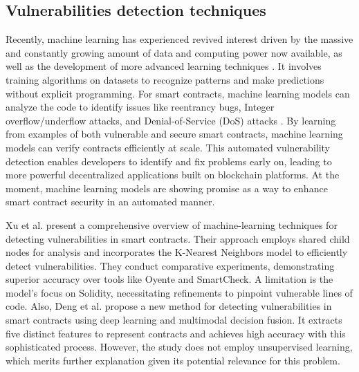 \documentclass[sigconf]{acmart}
\begin{document}
\subsection{Vulnerabilities detection techniques}
Recently, machine learning has experienced revived interest driven by the massive and constantly growing amount of data and computing power now available, as well as the development of more advanced learning techniques \cite{badillo2020introduction}. It involves training algorithms on datasets to recognize patterns and make predictions without explicit programming. For smart contracts, machine learning models can analyze the code to identify issues like reentrancy bugs, Integer overflow/underflow attacks, and Denial-of-Service (DoS) attacks \cite{krichen2023strengthening}. By learning from examples of both vulnerable and secure smart contracts, machine learning models can verify contracts efficiently at scale. This automated vulnerability detection enables developers to identify and fix problems early on, leading to more powerful decentralized applications built on blockchain platforms. At the moment, machine learning models are showing promise as a way to enhance smart contract security in an automated manner.

Xu et al. \cite{xu2021novel} present a comprehensive overview of machine-learning techniques for detecting vulnerabilities in smart contracts. Their approach employs shared child nodes for analysis and incorporates the K-Nearest Neighbors model to efficiently detect vulnerabilities. They conduct comparative experiments, demonstrating superior accuracy over tools like Oyente and SmartCheck. A limitation is the model's focus on Solidity, necessitating refinements to pinpoint vulnerable lines of code. Also, Deng et al. \cite{deng2023smart} propose a new method for detecting vulnerabilities in smart contracts using deep learning and multimodal decision fusion. It extracts five distinct features to represent contracts and achieves high accuracy with this sophisticated process. However, the study does not employ unsupervised learning, which merits further explanation given its potential relevance for this problem.
\end{document}
